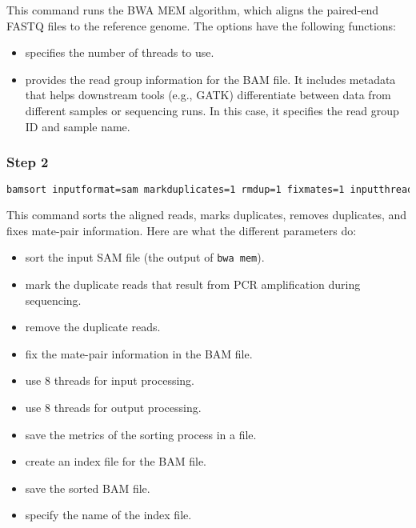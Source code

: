 This command runs the BWA MEM algorithm, which aligns the paired-end FASTQ files to the reference genome. The options have the following functions:
\begin{itemize}
    \item {} specifies the number of threads to use.
    \item {} provides the read group information for the BAM file. It includes metadata that helps downstream tools (e.g., GATK) differentiate between data from different samples or sequencing runs. In this case, it specifies the read group ID and sample name.
\end{itemize}

\subsubsection*{Step 2}

\begin{lstlisting}[breaklines=true, language=bash]
    bamsort inputformat=sam markduplicates=1 rmdup=1 fixmates=1 inputthreads=8 outputthreads=8 M=sample_metrics.txt index=1 O=sample.bam indexfilename=sample.bai
\end{lstlisting}

This command sorts the aligned reads, marks duplicates, removes duplicates, and fixes mate-pair information. Here are what the different parameters do:
\begin{itemize}
    \item {} sort the input SAM file (the output of \texttt{bwa mem}).
    \item {} mark the duplicate reads that result from PCR amplification during sequencing.
    \item {} remove the duplicate reads.
    \item {} fix the mate-pair information in the BAM file.
    \item {} use 8 threads for input processing.
    \item {} use 8 threads for output processing.
    \item {} save the metrics of the sorting process in a file.
    \item {} create an index file for the BAM file.
    \item {} save the sorted BAM file.
    \item {} specify the name of the index file.
\end{itemize}

